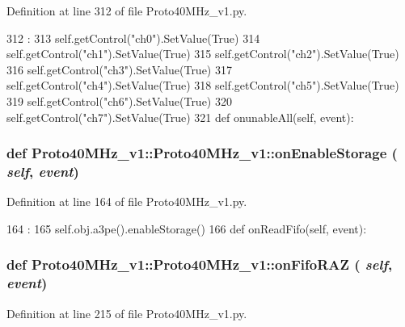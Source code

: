 Definition at line 312 of file Proto40MHz\_\-v1.py.


\begin{DoxyCode}
312                                 :
313         self.getControl("ch0").SetValue(True)
314         self.getControl("ch1").SetValue(True)
315         self.getControl("ch2").SetValue(True)
316         self.getControl("ch3").SetValue(True)
317         self.getControl("ch4").SetValue(True)
318         self.getControl("ch5").SetValue(True)
319         self.getControl("ch6").SetValue(True)
320         self.getControl("ch7").SetValue(True)
321 
    def onunableAll(self, event):
\end{DoxyCode}
\hypertarget{classProto40MHz__v1_1_1Proto40MHz__v1_ab87e6a24d0dffbaa784f6fe93f3f48ef}{
\subsubsection[{onEnableStorage}]{\setlength{\rightskip}{0pt plus 5cm}def Proto40MHz\_\-v1::Proto40MHz\_\-v1::onEnableStorage ( {\em self}, \/   {\em event})}}
\label{classProto40MHz__v1_1_1Proto40MHz__v1_ab87e6a24d0dffbaa784f6fe93f3f48ef}


Definition at line 164 of file Proto40MHz\_\-v1.py.


\begin{DoxyCode}
164                                     :
165         self.obj.a3pe().enableStorage()
166 
    def onReadFifo(self, event):
\end{DoxyCode}
\hypertarget{classProto40MHz__v1_1_1Proto40MHz__v1_affb4d39b74d18670a5c238e20633b18f}{
\subsubsection[{onFifoRAZ}]{\setlength{\rightskip}{0pt plus 5cm}def Proto40MHz\_\-v1::Proto40MHz\_\-v1::onFifoRAZ ( {\em self}, \/   {\em event})}}
\label{classProto40MHz__v1_1_1Proto40MHz__v1_affb4d39b74d18670a5c238e20633b18f}


Definition at line 215 of file Proto40MHz\_\-v1.py.


